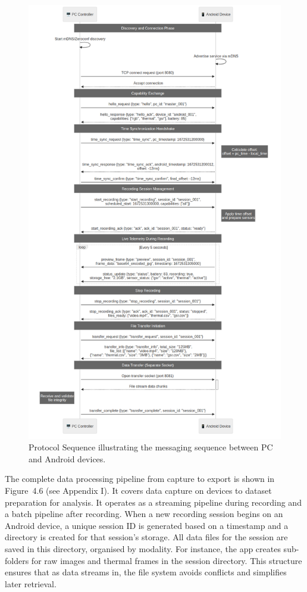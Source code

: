 \begin{figure}[htbp]
    \centring
    \includegraphics[width=\textwidth]{../diagrams/fig_4_05_protocol_sequence.png}
    \caption{Protocol Sequence illustrating the messaging sequence between PC and Android devices.}
    \label{fig:4_05_protocol_sequence}
\end{figure}

The complete data processing pipeline from capture to export is shown in Figure~4.6 (see Appendix I). It covers data capture on devices to dataset preparation for analysis. It operates as a streaming pipeline during recording and a batch pipeline after recording. When a new recording session begins on an Android device, a unique session ID is generated based on a timestamp and a directory is created for that session's storage. All data files for the session are saved in this directory, organised by modality. For instance, the app creates sub-folders for raw images and thermal frames in the session directory. This structure ensures that as data streams in, the file system avoids conflicts and simplifies later retrieval.

